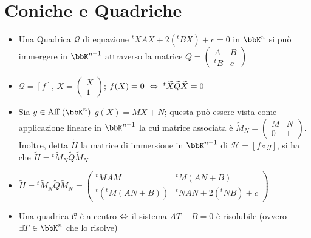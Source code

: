 \documentclass[a4paper,NoNotes,GeneralMath]{stdmdoc}
\begin{document}
	\section*{Coniche e Quadriche}
	\begin{itemize}
		\item Una Quadrica $\mathcal{Q}$ di equazione ${}^tXAX +2({}^tBX) +c = 0$ in $\bbK^n$ si può immergere in $\bbK^{n+1}$ attraverso la matrice $\widetilde{Q} = \left( \begin{array}{c|c} A & B \\ \hline {}^tB & c \end{array} \right) $
		\item $\mathcal{Q} = [f]$, $\widetilde{X} = \left(\begin{array}{c} X\\ \hline 1 \end{array} \right)$; $f(X)= 0 \ \sse \ {}^t\widetilde{X}\widetilde{Q}\widetilde{X}=0$
		\item Sia $g \in \Aff(\bbK^n)$ $g(X) = MX + N$; questa può essere vista come applicazione lineare in $\bbK^{n+1}$ la cui matrice associata è $\widetilde{M}_N = \left(\begin	{array}	{c|c} M & N\\ \hline 0 & 1\end{array} \right)$.
		Inoltre, detta $\widetilde{H}$ la matrice di immersione in $\bbK^{n+1}$ di $\mathcal{H} = [f \circ g]$, si ha che $\widetilde{H} = {}^t\widetilde{M}_N\widetilde{Q}\widetilde{M}_N$
		\item $\widetilde{H} = {}^t\widetilde{M}_N\widetilde{Q}\widetilde{M}_N = \left( \begin{array}{c|c} {}^tMAM & {}^tM(AN + B)\\ \hline {}^t({}^tM(AN + B)) & {}^tNAN + 2({}^tNB) + c \end{array} \right)$
		\item Una quadrica $\mathcal{C}$ è a centro $\Leftrightarrow$ il sistema $AT+B=0$ è risolubile (ovvero $\exists T \in \bbK^n$ che lo risolve)
	\end{itemize}
\end{document}
